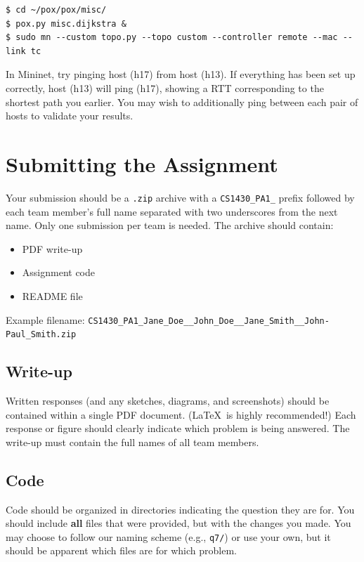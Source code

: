 \documentclass{article}
\begin{document}
\begin{topbot}
\begin{verbatim}
$ cd ~/pox/pox/misc/
$ pox.py misc.dijkstra &
$ sudo mn --custom topo.py --topo custom --controller remote --mac --link tc
\end{verbatim}
\end{topbot}

In Mininet, try pinging host (h17) from host (h13).
If everything has been set up correctly, host (h13) will ping (h17), showing a RTT corresponding to the shortest path you  earlier.
You may wish to additionally ping between each pair of hosts to validate your results.

\newpage
\section{Submitting the Assignment}
Your submission should be a \texttt{.zip} archive with a \texttt{CS1430\_PA1\_} prefix followed by each team member's full name separated with two underscores from the next name.
Only one submission per team is needed.
The archive should contain:
\begin{itemize}
    \item PDF write-up
    \item Assignment code
    \item README file
\end{itemize}

\noindent
Example filename: \texttt{CS1430\_PA1\_Jane\_Doe\_\_John\_Doe\_\_Jane\_Smith\_\_John-Paul\_Smith.zip}\\

\subsection*{Write-up}
Written responses (and any sketches, diagrams, and screenshots) should be contained within a single PDF document.
(\LaTeX~is highly recommended!)
Each response or figure should clearly indicate which problem is being answered.
The write-up must contain the full names of all team members.

\subsection*{Code}
Code should be organized in directories indicating the question they are for.
You should include \textbf{all} files that were provided, but with the changes you made.
You may choose to follow our naming scheme (e.g., \nolinkurl{q7/}) or use your own, but it should be apparent which files are for which problem.
\end{document}
